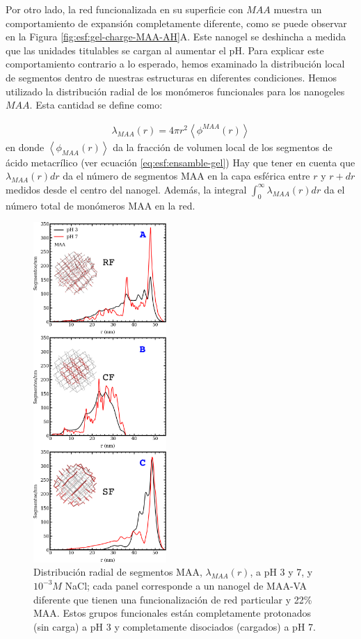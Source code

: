 Por otro lado, la red funcionalizada en su superficie con $MAA$ muestra un comportamiento de expansi\'on completamente diferente, como se puede observar en la Figura \ref{fig:esf:gel-charge-MAA-AH}A. Este nanogel se deshincha a medida que las unidades titulables se cargan al aumentar el pH. Para explicar este comportamiento contrario a lo esperado, hemos examinado la distribuci\'on local de segmentos dentro de nuestras estructuras en diferentes condiciones. Hemos utilizado la distribuci\'on radial de los mon\'omeros funcionales para los nanogeles $MAA$. Esta cantidad se define como:



%
\begin{align}
    \lambda_{MAA}(r)= 4\pi r^2\left<\phi^{MAA}(r)\right>
\end{align}
%
\noindent en donde $\left<\phi_{MAA}(r)\right>$ da la fracci\'on de volumen local de los segmentos de \'acido metacr\'ilico (ver ecuaci\'on \ref{eq:esf:ensamble-gel})
Hay que tener en cuenta que $\lambda_{MAA}(r) dr$ da el n\'umero de segmentos MAA en la capa esf\'erica entre $r$ y $r+dr$ medidos desde el centro del nanogel.
Adem\'as, la integral $\int_0^\infty \lambda_{MAA}(r) dr$ da el n\'umero total de mon\'omeros MAA en la red.


\begin{figure}[!htb]
     \centering
     \includegraphics[width=0.45\textwidth]{Figures/graphs-gel2/dist-MAA.pdf}
     \caption{Distribuci\'on radial de segmentos MAA, $\lambda_{MAA}(r)$, a pH 3 y 7, y $10^{-3}M$ NaCl; cada panel corresponde a un nanogel de  MAA-VA diferente que tienen una funcionalizaci\'on de red particular y 22\% MAA.
     	Estos grupos funcionales est\'an completamente protonados (sin carga) a pH 3 y completamente disociados (cargados) a pH 7.}
     \label{fig:esf:MAA-vs-r-distribution}
 \end{figure}

